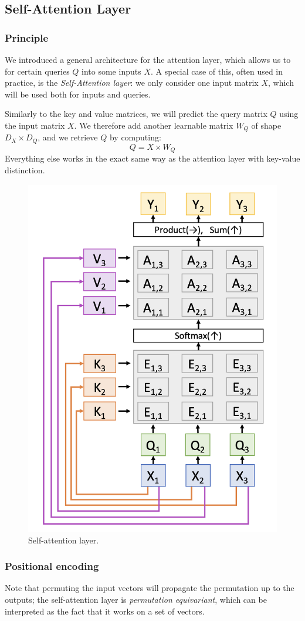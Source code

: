 
\subsection{Self-Attention Layer}
\subsubsection{Principle}
We introduced a general architecture for the attention layer, which allows us to  for certain queries $Q$ into some inputs $X$. A special case of this, often used in practice, is the \emph{Self-Attention layer}: we only consider one input matrix $X$, which will be used both for inputs and queries.

Similarly to the key and value matrices, we will predict the query matrix $Q$ using the input matrix $X$. We therefore add another learnable matrix $W_Q$ of shape $D_X\times D_Q$, and we retrieve $Q$ by computing:
\begin{equation*}
    Q = X\times W_Q
\end{equation*}
Everything else works in the exact same way as the attention layer with key-value distinction.

\begin{figure}[H]
    \centering
    \includegraphics[width=.35\textwidth]{images/self-attention-layer.png}
    \caption{Self-attention layer.}
\end{figure}

\subsubsection{Positional encoding}
Note that permuting the input vectors will propagate the permutation up to the outputs; the self-attention layer is \emph{permutation equivariant}, which can be interpreted as the fact that it works on a set of vectors. 

